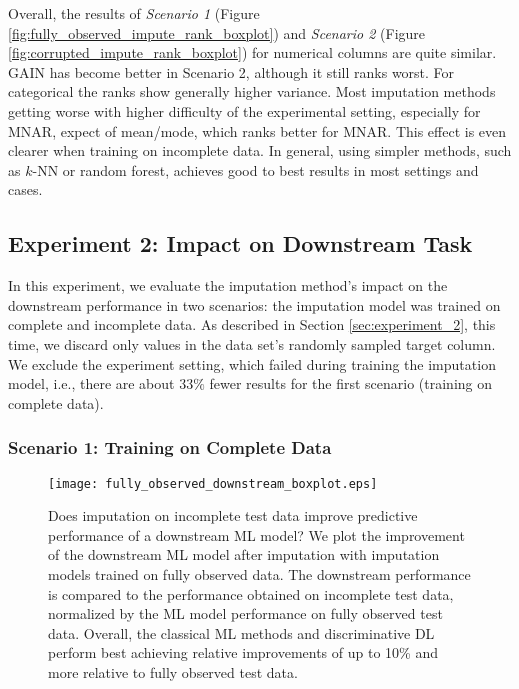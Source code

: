 Overall, the results of \textit{Scenario 1} (Figure \ref{fig:fully_observed_impute_rank_boxplot}) and \textit{Scenario 2} (Figure \ref{fig:corrupted_impute_rank_boxplot}) for numerical columns are quite similar. GAIN has become better in Scenario 2, although it still ranks worst. For categorical the ranks show generally higher variance. Most imputation methods getting worse with higher difficulty of the experimental setting, especially for MNAR, expect of mean/mode, which ranks better for MNAR. This effect is even clearer when training on incomplete data. In general, using simpler methods, such as $k$-NN or random forest, achieves good to best results in most settings and cases.


\subsection{Experiment 2: Impact on Downstream Task}

In this experiment, we evaluate the imputation method's impact on the downstream performance in two scenarios: the imputation model was trained on complete and incomplete data. As described in Section \ref{sec:experiment_2}, this time, we discard only values in the data set's randomly sampled target column. We exclude the experiment setting, which failed during training the imputation model, i.e., there are about $33\%$ fewer results for the first scenario (training on complete data).


\subsubsection{Scenario 1: Training on Complete Data}

\begin{figure}\centering
	\texttt{[image: fully\_observed\_downstream\_boxplot.eps]}
	\caption[Downstream Ranks - Fully Observed]{Does imputation on incomplete test data improve predictive performance of a downstream ML model? We plot the improvement of the downstream ML model after imputation with imputation models trained on fully observed data. The downstream performance is compared to the performance obtained on incomplete test data, normalized by the ML model performance on fully observed test data. Overall, the classical ML methods and discriminative DL perform best achieving relative improvements of up to 10\% and more relative to fully observed test data.
    }
	\label{fig:fully_observed_downstream_boxplot}
\end{figure}

